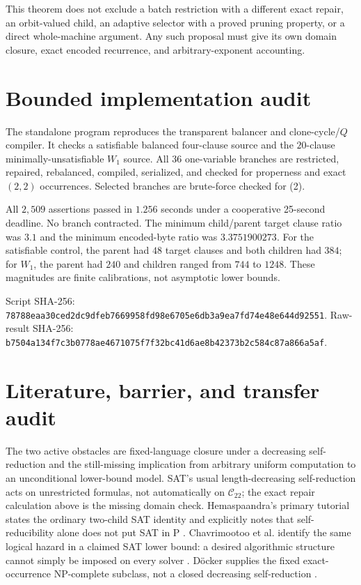 \documentclass[11pt]{article}
\begin{document}
This theorem does not exclude a batch restriction with a different exact
repair, an orbit-valued child, an adaptive selector with a proved pruning
property, or a direct whole-machine argument.  Any such proposal must give
its own domain closure, exact encoded recurrence, and arbitrary-exponent
accounting.

\section{Bounded implementation audit}
The standalone program
 reproduces the
transparent balancer and clone-cycle/$Q$ compiler.  It checks a satisfiable
balanced four-clause source and the $20$-clause minimally-unsatisfiable
$W_1$ source.  All $36$ one-variable branches are restricted, repaired,
rebalanced, compiled, serialized, and checked for properness and exact
$(2,2)$ occurrences.  Selected branches are brute-force checked for (2).

All $2{,}509$ assertions passed in $1.256$ seconds under a cooperative
25-second deadline.  No branch contracted.  The minimum child/parent target
clause ratio was $3.1$ and the minimum encoded-byte ratio was
$3.3751900273$.  For the satisfiable control, the parent had $48$ target
clauses and both children had $384$; for $W_1$, the parent had $240$ and
children ranged from $744$ to $1248$.  These magnitudes are finite
calibrations, not asymptotic lower bounds.

Script SHA-256:
\texttt{78788eaa30ced2dc9dfeb7669958fd98e6705e6db3a9ea7fd74e48e644d92551}.
Raw-result SHA-256:
\texttt{b7504a134f7c3b0778ae4671075f7f32bc41d6ae8b42373b2c584c87a866a5af}.

\section{Literature, barrier, and transfer audit}
The two active obstacles are fixed-language closure under a decreasing
self-reduction and the still-missing implication from arbitrary uniform
computation to an unconditional lower-bound model.  SAT's usual
length-decreasing self-reduction acts on unrestricted formulas, not
automatically on $\mathcal C_{22}$; the exact repair calculation above is
the missing domain check.  Hemaspaandra's primary tutorial states the
ordinary two-child SAT identity and explicitly notes that self-reducibility
alone does not put SAT in P \cite{hemaspaandra}.  Chavrimootoo et al. identify
the same logical hazard in a claimed SAT lower bound: a desired algorithmic
structure cannot simply be imposed on every solver \cite{critique}.
D\"ocker supplies the fixed exact-occurrence NP-complete subclass, not a
closed decreasing self-reduction \cite{docker}.
\end{document}
